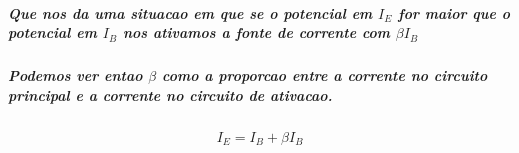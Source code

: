\documentclass[12pt,twoside, a4paper, twocolumn]{article}
\begin{document}
\subparagraph*{Que nos da uma situacao em que se o potencial em $I_E$ for maior que o potencial em $I_B$  nos ativamos a fonte de corrente com $\beta I_B$}

\subparagraph*{Podemos ver entao $\beta$ como a proporcao entre a corrente no circuito principal e a corrente no circuito de ativacao.}

\begin{equation}
    \begin{aligned}
        I_E = I_B + \beta I_B \\
    \end{aligned}
\end{equation}
\end{document}
